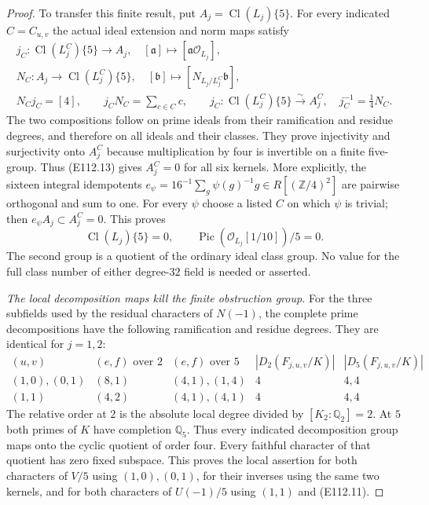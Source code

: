 \begin{proof}
To transfer this finite result, put $A_j=\operatorname{Cl}(L_j)\{5\}$.
For every indicated $C=C_{u,v}$ the actual ideal extension
and norm maps satisfy
\[
 \begin{gathered}
 j_C:\operatorname{Cl}(L_j^C)\{5\}\longrightarrow A_j,
 \quad [\mathfrak a]\longmapsto[\mathfrak a\mathcal O_{L_j}],\\
 N_C:A_j\longrightarrow\operatorname{Cl}(L_j^C)\{5\},
 \quad[\mathfrak b]\longmapsto[N_{L_j/L_j^C}\mathfrak b],\\
 N_Cj_C=[4],\qquad j_CN_C=\sum_{c\in C}c,
 \qquad j_C:\operatorname{Cl}(L_j^C)\{5\}\xrightarrow{\sim}A_j^C,
 \quad j_C^{-1}=\tfrac14N_C.
 \end{gathered}
 \tag{E112.14}
\]
The two compositions follow on prime ideals from their
ramification and residue degrees, and therefore on all ideals
and their classes.  They prove injectivity and surjectivity
onto $A_j^C$ because multiplication by four is invertible
on a finite five-group.  Thus (E112.13) gives $A_j^C=0$
for all six kernels.  More explicitly, the sixteen integral
idempotents
$e_\psi=16^{-1}\sum_g\psi(g)^{-1}g\in R[(\mathbb Z/4)^2]$
are pairwise orthogonal and sum to one.  For every $\psi$
choose a listed $C$ on which $\psi$ is trivial; then
$e_\psi A_j\subset A_j^C=0$.  This proves
\[
            \operatorname{Cl}(L_j)\{5\}=0,
       \qquad\operatorname{Pic}(\mathcal O_{L_j}[1/10])/5=0.
 \tag{E112.15}
\]
The second group is a quotient of the ordinary ideal class
group.  No value for the full class number of either
degree-$32$ field is needed or asserted.

\emph{The local decomposition maps kill the finite obstruction group.}
For the three subfields used by the residual characters of
$N(-1)$, the complete prime decompositions have the following
ramification and residue degrees.  They are identical for
$j=1,2$:
\[
\begin{array}{c|c|c|c|c}
(u,v)&(e,f)\text{ over }2&(e,f)\text{ over }5&
 |D_{2}(F_{j,u,v}/K)|&|D_{5}(F_{j,u,v}/K)|\\\hline
(1,0),(0,1)&(8,1)&(4,1),(1,4)&4&4,4\\
(1,1)&(4,2)&(4,1),(4,1)&4&4,4
\end{array}
\tag{E112.16}
\]
The relative order at $2$ is the absolute local degree
divided by $[K_2:\mathbb Q_2]=2$.  At $5$ both primes of
$K$ have completion $\mathbb Q_5$.  Thus every indicated
decomposition group maps onto the cyclic quotient of order
four.  Every faithful character of that quotient has zero
fixed subspace.  This proves the local assertion for both
characters of $V/5$ using $(1,0),(0,1)$, for their inverses
using the same two kernels, and for both characters of
$U(-1)/5$ using $(1,1)$ and (E112.11).


\end{proof}
